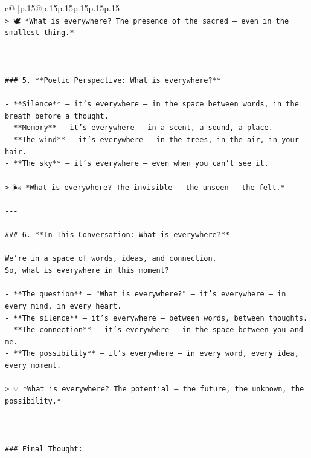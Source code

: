 \documentclass{article}
\begin{document}
{\begin{supertabular}{c@{$\;$}|p{.15\linewidth}@{}p{.15\linewidth}p{.15\linewidth}p{.15\linewidth}p{.15\linewidth}p{.15\linewidth}}
{{{\\ 
\texttt{> 🕊️ *What is everywhere? The presence of the sacred — even in the smallest thing.*} \\
\\ 
\texttt{{-}{-}{-}} \\
\\ 
\texttt{\#\#\# 5. **Poetic Perspective: What is everywhere?**} \\
\\ 
\texttt{{-} **Silence** — it’s everywhere — in the space between words, in the breath before a thought.} \\
\texttt{{-} **Memory** — it’s everywhere — in a scent, a sound, a place.} \\
\texttt{{-} **The wind** — it’s everywhere — in the trees, in the air, in your hair.} \\
\texttt{{-} **The sky** — it’s everywhere — even when you can’t see it.} \\
\\ 
\texttt{> 🌬️ *What is everywhere? The invisible — the unseen — the felt.*} \\
\\ 
\texttt{{-}{-}{-}} \\
\\ 
\texttt{\#\#\# 6. **In This Conversation: What is everywhere?**} \\
\\ 
\texttt{We’re in a space of words, ideas, and connection.  } \\
\texttt{So, what is everywhere in this moment?} \\
\\ 
\texttt{{-} **The question** — "What is everywhere?" — it’s everywhere — in every mind, in every heart.} \\
\texttt{{-} **The silence** — it’s everywhere — between words, between thoughts.} \\
\texttt{{-} **The connection** — it’s everywhere — in the space between you and me.} \\
\texttt{{-} **The possibility** — it’s everywhere — in every word, every idea, every moment.} \\
\\ 
\texttt{> 💡 *What is everywhere? The potential — the future, the unknown, the possibility.*} \\
\\ 
\texttt{{-}{-}{-}} \\
\\ 
\texttt{\#\#\# Final Thought:  } \\
}}}
\end{supertabular}}
\end{document}

